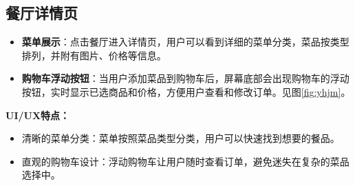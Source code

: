  
\subsection{餐厅详情页}
\begin{itemize}
    \item \textbf{菜单展示}：点击餐厅进入详情页，用户可以看到详细的菜单分类，菜品按类型排列，并附有图片、价格等信息。
    \item \textbf{购物车浮动按钮}：当用户添加菜品到购物车后，屏幕底部会出现购物车的浮动按钮，实时显示已选商品和价格，方便用户查看和修改订单。见图\ref{fig:yhjm}。
\end{itemize}
\textbf{UI/UX特点：}
\begin{itemize}
    \item 清晰的菜单分类：菜单按照菜品类型分类，用户可以快速找到想要的餐品。
    \item 直观的购物车设计：浮动购物车让用户随时查看订单，避免迷失在复杂的菜品选择中。
\end{itemize}
